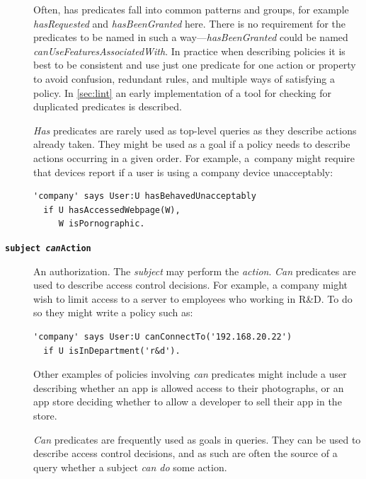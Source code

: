 \documentclass[thesis.tex]{subfiles}
\begin{document}
\begin{description}
  Often, has predicates fall into common patterns and groups, for example
  \emph{hasRequested} and \emph{hasBeenGranted} here.  There is no requirement
  for the predicates to be named in such a way---\emph{hasBeenGranted} could be
  named \emph{canUseFeaturesAssociatedWith}.  In practice when describing
  policies it is best to be consistent and use just one predicate for one action
  or property to avoid confusion, redundant rules, and multiple ways of
  satisfying a policy.  In \autoref{sec:lint} an early implementation of a tool
  for checking for duplicated predicates is described.

  \emph{Has} predicates are rarely used as top-level queries as they
  describe actions already taken.  They might be used as a goal if a
  policy needs to describe actions occurring in a given order.  For
  example, a~company might require that devices report if a user is
  using a company device unacceptably:

  \begin{lstlisting}
'company' says User:U hasBehavedUnacceptably
  if U hasAccessedWebpage(W),
     W isPornographic.
  \end{lstlisting}

\item[\bfseries\texttt{subject \emph{can}Action}]
  An authorization.
  The \emph{subject} may perform the \emph{action}.
  \emph{Can} predicates are used to describe access control decisions.
  For example, a company might wish to limit access to a server to
  employees who working in R\&D.  To do so they might write a policy
  such as:
  \begin{lstlisting}
'company' says User:U canConnectTo('192.168.20.22')
  if U isInDepartment('r&d').
  \end{lstlisting}
  Other examples of policies involving \emph{can} predicates might include a
  user describing whether an app is allowed access to their photographs,
  or an app store deciding whether to allow a developer to sell their
  app in the store.

  \emph{Can} predicates are frequently used as goals in queries.  They can be
  used to describe access control decisions, and as such are often the source of
  a query whether a subject \emph{can do} some action. 


\end{description}
\end{document}
